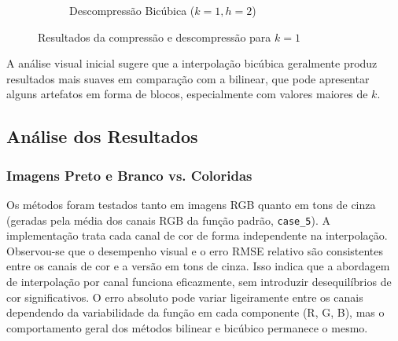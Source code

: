 \documentclass[12pt, a4paper]{article}
\begin{document}
\begin{figure}[H]
\begin{subfigure}[b]{0.45\textwidth}
        \caption{Descompressão Bicúbica ($k=1, h=2$)}
        \label{fig:zoo_bicubic_k1h2}
    \end{subfigure}
    \caption{Resultados da compressão e descompressão para $k=1$}
    \label{fig:zoo_results_k1}
\end{figure}

A análise visual inicial sugere que a interpolação bicúbica geralmente produz resultados mais suaves em comparação com a bilinear, que pode apresentar alguns artefatos em forma de blocos, especialmente com valores maiores de $k$.

\subsection{Análise dos Resultados}

\subsubsection{Imagens Preto e Branco vs. Coloridas}
Os métodos foram testados tanto em imagens RGB quanto em tons de cinza (geradas pela média dos canais RGB da função padrão, \texttt{case\_5}). A implementação trata cada canal de cor de forma independente na interpolação. Observou-se que o desempenho visual e o erro RMSE relativo são consistentes entre os canais de cor e a versão em tons de cinza. Isso indica que a abordagem de interpolação por canal funciona eficazmente, sem introduzir desequilíbrios de cor significativos. O erro absoluto pode variar ligeiramente entre os canais dependendo da variabilidade da função em cada componente (R, G, B), mas o comportamento geral dos métodos bilinear e bicúbico permanece o mesmo.
\end{document}
